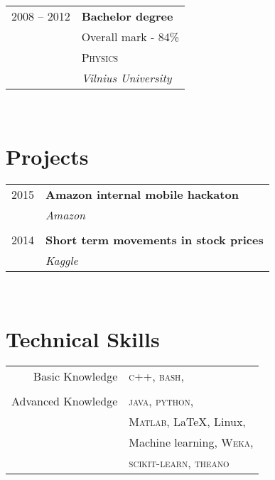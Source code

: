 \documentclass[10pt]{article} %
\begin{document}
{\begin{minipage}[t]{0.44\textwidth}
\begin{tabular}{rl}
2008 -- 2012 & \textbf{Bachelor degree}\\
& \small Overall mark - 84\% \\
& \textsc{Physics} \\ 
& \textit{Vilnius University} 
	

\end{tabular}\\[10pt]


\section{Projects} 

\begin{tabular}{rl}

2015     & \textbf{Amazon internal mobile hackaton}\\
& \textit{Amazon}\\
&\\
2014	 & \textbf{Short term movements in stock prices}\\
& \textit{Kaggle}

\end{tabular}\\[10pt]


\section{Technical Skills} 

\begin{tabular}{rl}
Basic Knowledge
& \textsc{c++}, \textsc{bash},\\
& \\
Advanced Knowledge
& \textsc{java}, \textsc{python},\\
& \textsc{Matlab}, \LaTeX, Linux,\\
& Machine learning, \textsc{Weka},\\
& \textsc{scikit-learn}, \textsc{theano}
\end{tabular}


\end{minipage}}
\end{document}
